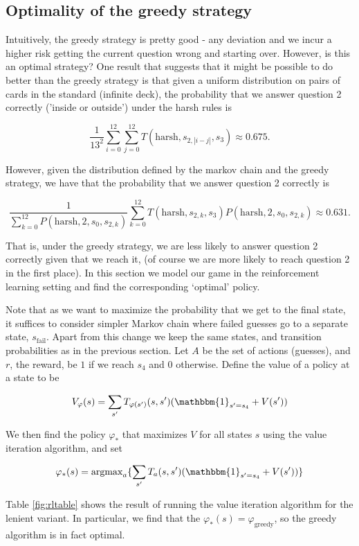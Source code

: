 \documentclass[12pt]{article}
\theoremstyle{definition}
\begin{document}
\subsection{Optimality of the greedy strategy}
Intuitively, the greedy strategy is pretty good - any deviation and we incur a higher risk getting the current question wrong and starting over. However, is this an optimal strategy? One result that suggests that it might be possible to do better than the greedy strategy is that given a uniform distribution on pairs of cards in the standard (infinite deck), the probability that we answer question 2 correctly ('inside or outside') under the harsh rules is

$$
\frac{1}{13^2}\sum_{i=0}^{12}\sum_{j=0}^{12}T(\text{harsh}, s_{2, |i-j|} , s_3) \approx 0.675.
$$

However, given the distribution defined by the markov chain and the greedy strategy, we have that the probability that we answer question 2 correctly is 

$$
\frac{1}{\sum_{k=0}^{12}P(\text{harsh}, 2, s_0, s_{2, k})}\sum_{k=0}^{12} T(\text{harsh}, s_{2, k}, s_3)P(\text{harsh}, 2, s_0, s_{2, k}) \approx 0.631.
$$

That is, under the greedy strategy, we are less likely to answer question 2 correctly given that we reach it, (of course we are more likely to reach question 2 in the first place). In this section we model our game in the reinforcement learning setting and find the corresponding `optimal' policy. 

Note that as we want to maximize the probability that we get to the final state, it suffices to consider simpler Markov chain where failed guesses go to a separate state, $s_{\text{fail}}$. Apart from this change we keep the same states, and transition probabilities as in the previous section. Let $A$ be the set of actions (guesses), and $r$, the reward, be $1$ if we reach $s_4$ and $0$ otherwise. Define the value of a policy at a state to be

$$V_\varphi(s) = \sum_{s'} T_{\varphi(s')}(s, s')(\mathbbm{1}_{s' = s_4} + V(s'))$$

\newcommand{\argmax}{\mathrm{argmax}}

We then find the policy $\varphi_*$ that maximizes $V$ for all states $s$ using the value iteration algorithm, and set 

$$\varphi_*(s) = \argmax_a\{\sum_{s'} T_a(s, s')(\mathbbm{1}_{s' = s_4} + V(s'))\}$$

Table \ref{fig:rltable} shows the result of running the value iteration algorithm for the lenient variant. In particular, we find that the $\varphi_*(s) = \varphi_{\text{greedy}}$, so the greedy algorithm is in fact optimal.
\end{document}

